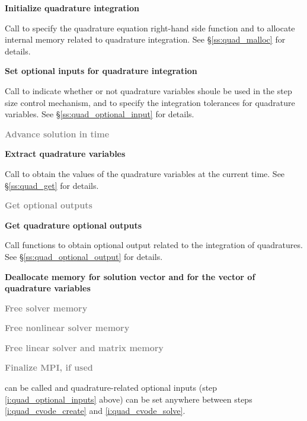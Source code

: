 \begin{Steps}
\item
  {\bf Initialize quadrature integration}

  Call  to specify the quadrature equation right-hand
  side function and to allocate internal memory related to quadrature integration.
  See \S\ref{ss:quad_malloc} for details.

\item\label{i:quad_optional_inputs}
  {\bf Set optional inputs for quadrature integration}

  Call  to indicate whether or not quadrature variables
  shoule be used in the step size control mechanism, and to specify the integration
  tolerances for quadrature variables.
  See \S\ref{ss:quad_optional_input} for details.

\item\label{i:quad_cvode_solve}
  \textcolor{gray}{\bf Advance solution in time}

\item
  {\bf Extract quadrature variables}

  Call  to obtain the values of the quadrature variables at
  the current time. See \S\ref{ss:quad_get} for details.

\item
  \textcolor{gray}{\bf Get optional outputs}

\item
  {\bf Get quadrature optional outputs}

  Call  functions to obtain optional output related to
  the integration of quadratures.
  See \S\ref{ss:quad_optional_output} for details.

\item
  {\bf Deallocate memory for solution vector and for the vector of quadrature variables}

\item
  \textcolor{gray}{\bf Free solver memory}

\item
  \textcolor{gray}{\bf Free nonlinear solver memory}

\item
  \textcolor{gray}{\bf Free linear solver and matrix memory}

\item
  \textcolor{gray}{\bf Finalize MPI, if used}

\end{Steps}
 can be called and quadrature-related optional inputs
(step \ref{i:quad_optional_inputs} above) can be set anywhere between steps
\ref{i:quad_cvode_create} and \ref{i:quad_cvode_solve}.

